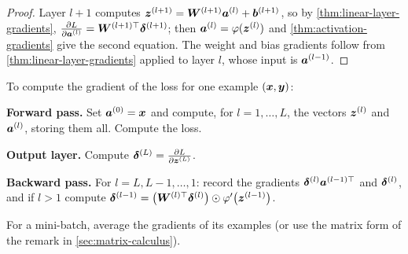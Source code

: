 \begin{proof}
Layer $l + 1$ computes $\bm{z}^{(l+1)} = \bm{W}^{(l+1)}\bm{a}^{(l)} + \bm{b}^{(l+1)}$, so by
\cref{thm:linear-layer-gradients}, $\frac{\partial L}{\partial \bm{a}^{(l)}} = \bm{W}^{(l+1)\top}\bm{\delta}^{(l+1)}$;
then $\bm{a}^{(l)} = \varphi(\bm{z}^{(l)})$ and \cref{thm:activation-gradients} give the
second equation. The weight and bias gradients follow from
\cref{thm:linear-layer-gradients} applied to layer $l$, whose input is
$\bm{a}^{(l-1)}$.
\end{proof}

\begin{algorithm}[Backpropagation]\label{alg:backprop}
To compute the gradient of the loss for one example $(\bm{x}, \bm{y})$:
\begin{steps}
  \item \textbf{Forward pass.} Set $\bm{a}^{(0)} = \bm{x}$ and compute, for
    $l = 1, \dots, L$, the vectors $\bm{z}^{(l)}$ and $\bm{a}^{(l)}$, storing them all.
    Compute the loss.
  \item \textbf{Output layer.} Compute $\bm{\delta}^{(L)} = \frac{\partial L}{\partial \bm{z}^{(L)}}$.
  \item \textbf{Backward pass.} For $l = L, L - 1, \dots, 1$: record the gradients
    $\bm{\delta}^{(l)}\bm{a}^{(l-1)\top}$ and $\bm{\delta}^{(l)}$, and if $l > 1$ compute
    $\bm{\delta}^{(l-1)} = \bigl(\bm{W}^{(l)\top}\bm{\delta}^{(l)}\bigr) \odot
    \varphi'\bigl(\bm{z}^{(l-1)}\bigr)$.
\end{steps}
For a mini-batch, average the gradients of its examples (or use the matrix form
of the remark in \cref{sec:matrix-calculus}).
\end{algorithm}

